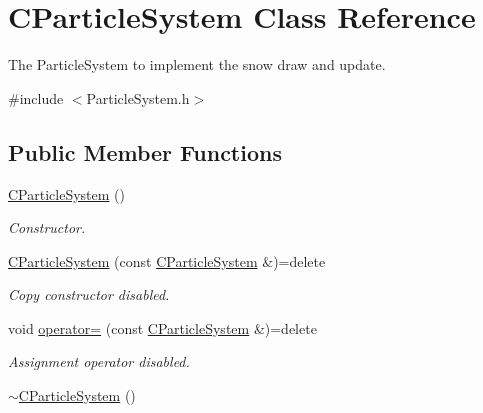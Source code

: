 \hypertarget{class_c_particle_system}{\section{C\+Particle\+System Class Reference}
\label{class_c_particle_system}
}


The Particle\+System to implement the snow draw and update.  




{\ttfamily \#include $<$Particle\+System.\+h$>$}

\subsection*{Public Member Functions}
\begin{DoxyCompactItemize}
\item 
\hypertarget{class_c_particle_system_aeadc49bba6ac1391e8c0e8a2fa5b4f41}{\hyperlink{class_c_particle_system_aeadc49bba6ac1391e8c0e8a2fa5b4f41}{C\+Particle\+System} ()}\label{class_c_particle_system_aeadc49bba6ac1391e8c0e8a2fa5b4f41}

\begin{DoxyCompactList}\small\item\em Constructor. \end{DoxyCompactList}\item 
\hypertarget{class_c_particle_system_a1e46a5f93ae2f437e5d6b3c4b6305f80}{\hyperlink{class_c_particle_system_a1e46a5f93ae2f437e5d6b3c4b6305f80}{C\+Particle\+System} (const \hyperlink{class_c_particle_system}{C\+Particle\+System} \&)=delete}\label{class_c_particle_system_a1e46a5f93ae2f437e5d6b3c4b6305f80}

\begin{DoxyCompactList}\small\item\em Copy constructor disabled. \end{DoxyCompactList}\item 
\hypertarget{class_c_particle_system_a60636bbc9ceff92f1a89b4d7412eccdf}{void \hyperlink{class_c_particle_system_a60636bbc9ceff92f1a89b4d7412eccdf}{operator=} (const \hyperlink{class_c_particle_system}{C\+Particle\+System} \&)=delete}\label{class_c_particle_system_a60636bbc9ceff92f1a89b4d7412eccdf}

\begin{DoxyCompactList}\small\item\em Assignment operator disabled. \end{DoxyCompactList}\item 
\hypertarget{class_c_particle_system_aa73fea125a7e06b0cdfe622af9fdcb6b}{\hyperlink{class_c_particle_system_aa73fea125a7e06b0cdfe622af9fdcb6b}{$\sim$\+C\+Particle\+System} ()}\label{class_c_particle_system_aa73fea125a7e06b0cdfe622af9fdcb6b}


\end{DoxyCompactItemize}
